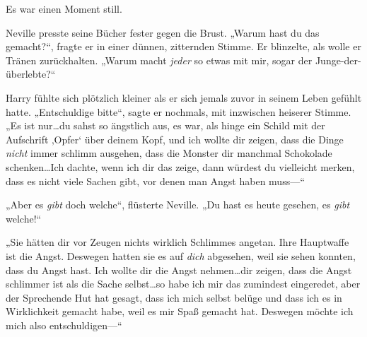 Es war einen Moment still.

Neville presste seine Bücher fester gegen die Brust. „Warum hast du das gemacht?“, fragte er in einer dünnen, zitternden Stimme. Er blinzelte, als wolle er Tränen zurückhalten. „Warum macht \emph{jeder} so etwas mit mir, sogar der Junge-der-überlebte?“

Harry fühlte sich plötzlich kleiner als er sich jemals zuvor in seinem Leben gefühlt hatte. „Entschuldige bitte“, sagte er nochmals, mit inzwischen heiserer Stimme. „Es ist nur…du sahst so ängstlich aus, es war, als hinge ein Schild mit der Aufschrift ‚Opfer‘ über deinem Kopf, und ich wollte dir zeigen, dass die Dinge \emph{nicht} immer schlimm ausgehen, dass die Monster dir manchmal Schokolade schenken…Ich dachte, wenn ich dir das zeige, dann würdest du vielleicht merken, dass es nicht viele Sachen gibt, vor denen man Angst haben muss—“

„Aber es \emph{gibt} doch welche“, flüsterte Neville. „Du hast es heute gesehen, es \emph{gibt} welche!“

„Sie hätten dir vor Zeugen nichts wirklich Schlimmes angetan. Ihre Hauptwaffe ist die Angst. Deswegen hatten sie es auf \emph{dich} abgesehen, weil sie sehen konnten, dass du Angst hast. Ich wollte dir die Angst nehmen…dir zeigen, dass die Angst schlimmer ist als die Sache selbst…so habe ich mir das zumindest eingeredet, aber der Sprechende Hut hat gesagt, dass ich mich selbst belüge und dass ich es in Wirklichkeit gemacht habe, weil es mir Spaß gemacht hat. Deswegen möchte ich mich also entschuldigen—“

